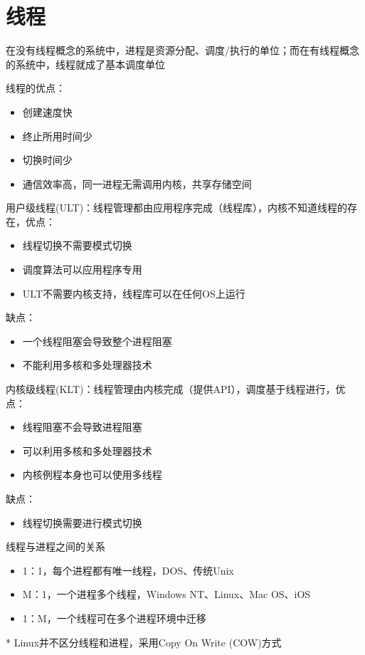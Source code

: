 
\section{线程}
在没有线程概念的系统中，进程是资源分配、调度/执行的单位；而在有线程概念的系统中，线程就成了基本调度单位

线程的优点：
\begin{itemize}
    \item 创建速度快
    \item 终止所用时间少
    \item 切换时间少
    \item 通信效率高，同一进程无需调用内核，共享存储空间
\end{itemize}

用户级线程(ULT)：线程管理都由应用程序完成（线程库），内核不知道线程的存在，优点：
\begin{itemize}
    \item 线程切换不需要模式切换
    \item 调度算法可以应用程序专用
    \item ULT不需要内核支持，线程库可以在任何OS上运行
\end{itemize}
缺点：
\begin{itemize}
    \item 一个线程阻塞会导致整个进程阻塞
    \item 不能利用多核和多处理器技术
\end{itemize}

内核级线程(KLT)：线程管理由内核完成（提供API），调度基于线程进行，优点：
\begin{itemize}
    \item 线程阻塞不会导致进程阻塞
    \item 可以利用多核和多处理器技术
    \item 内核例程本身也可以使用多线程
\end{itemize}
缺点：
\begin{itemize}
    \item 线程切换需要进行模式切换
\end{itemize}

线程与进程之间的关系
\begin{itemize}
    \item 1：1，每个进程都有唯一线程，DOS、传统Unix
    \item M：1，一个进程多个线程，Windows NT、Linux、Mac OS、iOS
    \item 1：M，一个线程可在多个进程环境中迁移
\end{itemize}

* Linux并不区分线程和进程，采用Copy On Write (COW)方式